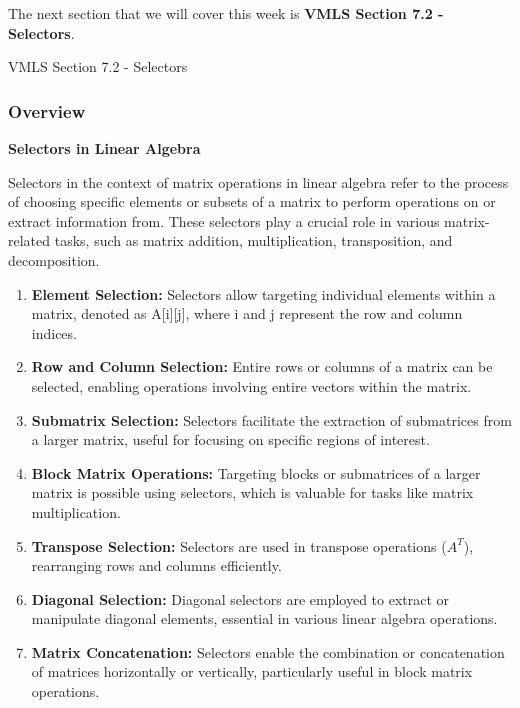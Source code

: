 The next section that we will cover this week is \textbf{VMLS Section 7.2 - Selectors}.

\begin{notes}{VMLS Section 7.2 - Selectors}
    \subsubsection*{Overview}

    \textbf{Selectors in Linear Algebra}

    Selectors in the context of matrix operations in linear algebra refer to the process of choosing specific elements or subsets of a matrix to perform operations on or extract information from. These 
    selectors play a crucial role in various matrix-related tasks, such as matrix addition, multiplication, transposition, and decomposition.

    \begin{enumerate}
        \item \textbf{Element Selection:} Selectors allow targeting individual elements within a matrix, denoted as A[i][j], where i and j represent the row and column indices.
        
        \item \textbf{Row and Column Selection:} Entire rows or columns of a matrix can be selected, enabling operations involving entire vectors within the matrix.
        
        \item \textbf{Submatrix Selection:} Selectors facilitate the extraction of submatrices from a larger matrix, useful for focusing on specific regions of interest.
        
        \item \textbf{Block Matrix Operations:} Targeting blocks or submatrices of a larger matrix is possible using selectors, which is valuable for tasks like matrix multiplication.
        
        \item \textbf{Transpose Selection:} Selectors are used in transpose operations ($A^T$), rearranging rows and columns efficiently.
        
        \item \textbf{Diagonal Selection:} Diagonal selectors are employed to extract or manipulate diagonal elements, essential in various linear algebra operations.
        
        \item \textbf{Matrix Concatenation:} Selectors enable the combination or concatenation of matrices horizontally or vertically, particularly useful in block matrix operations.
        

\end{enumerate}
\end{notes}
